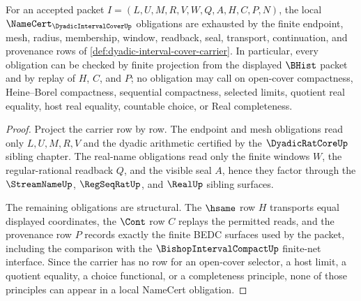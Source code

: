 \begin{theorem}
\label{thm:dyadic-interval-cover-namecert-obligations}
For an accepted packet $I=(L,U,M,R,V,W,Q,A,H,C,P,N)$, the local $\NameCert_{\DyadicIntervalCoverUp}$ obligations are exhausted by the finite endpoint, mesh, radius, membership, window, readback, seal, transport, continuation, and provenance rows of \autoref{def:dyadic-interval-cover-carrier}. In particular, every obligation can be checked by finite projection from the displayed $\BHist$ packet and by replay of $H$, $C$, and $P$; no obligation may call on open-cover compactness, Heine--Borel compactness, sequential compactness, selected limits, quotient real equality, host real equality, countable choice, or Real completeness.
\end{theorem}
\begin{proof}
Project the carrier row by row. The endpoint and mesh obligations read only $L,U,M,R,V$ and the dyadic arithmetic certified by the $\DyadicRatCoreUp$ sibling chapter. The real-name obligations read only the finite windows $W$, the regular-rational readback $Q$, and the visible seal $A$, hence they factor through the $\StreamNameUp$, $\RegSeqRatUp$, and $\RealUp$ sibling surfaces.

The remaining obligations are structural. The $\hsame$ row $H$ transports equal displayed coordinates, the $\Cont$ row $C$ replays the permitted reads, and the provenance row $P$ records exactly the finite BEDC surfaces used by the packet, including the comparison with the $\BishopIntervalCompactUp$ finite-net interface. Since the carrier has no row for an open-cover selector, a host limit, a quotient equality, a choice functional, or a completeness principle, none of those principles can appear in a local NameCert obligation.
\end{proof}

